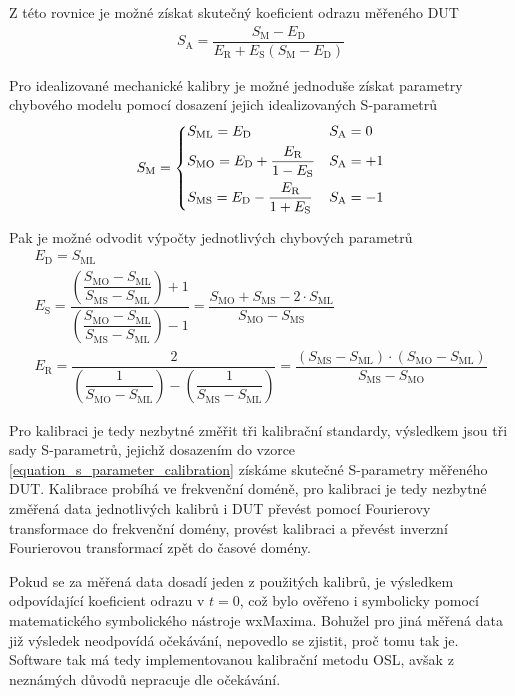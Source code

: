 Z této rovnice je možné získat skutečný koeficient odrazu měřeného DUT
\begin{equation}
\begin{gathered}
	S_\mathrm{A} = \dfrac{S_\mathrm{M} - E_\textrm{D}}{E_\textrm{R} + E_\textrm{S} \left( S_\mathrm{M} - E_\textrm{D} \right) }
\end{gathered}
\label{equation_s_parameter_calibration}
\end{equation}

Pro idealizované mechanické kalibry je možné jednoduše získat parametry chybového modelu pomocí dosazení jejich idealizovaných S-parametrů
\begin{equation}
\begin{gathered}
S_\mathrm{M}=
   \begin{dcases}
	S_\mathrm{ML} = E_\textrm{D} & S_\mathrm{A}=0	\\
	S_\mathrm{MO} = E_\textrm{D} + \dfrac{E_\textrm{R}}{1-E_\mathrm{S}}  & S_\mathrm{A}=+1	\\
	S_\mathrm{MS} = E_\textrm{D} - \dfrac{E_\textrm{R}}{1+E_\mathrm{S}}  & S_\mathrm{A}=-1
   \end{dcases}
\end{gathered}
\end{equation}

Pak je možné odvodit výpočty jednotlivých chybových parametrů
\begin{equation}
\begin{gathered}
   E_\textrm{D}=S_\mathrm{ML} \\
   E_\mathrm{S}=\dfrac{\left( \dfrac{S_\mathrm{MO}-S_\mathrm{ML}}{S_\mathrm{MS}-S_\mathrm{ML}}\right)  +1}{\left( \dfrac{S_\mathrm{MO}-S_\mathrm{ML}}{S_\mathrm{MS}-S_\mathrm{ML}}\right) -1} = \dfrac{S_\mathrm{MO} + S_\mathrm{MS} -2\cdot S_\mathrm{ML}}{S_\mathrm{MO} - S_\mathrm{MS}} \\
   E_\mathrm{R}=\dfrac{2}{\left( \dfrac{1}{S_\mathrm{MO}-S_\mathrm{ML}}\right)  - \left( \dfrac{1}{S_\mathrm{MS}-S_\mathrm{ML}} \right) } = \dfrac{\left( S_\mathrm{MS} - S_\mathrm{ML} \right) \cdot \left( S_\mathrm{MO} - S_\mathrm{ML} \right) }{S_\mathrm{MS} - S_\mathrm{MO}}
\end{gathered}
\end{equation}

Pro kalibraci je tedy nezbytné změřit tři kalibrační standardy, výsledkem jsou tři sady S-parametrů, jejichž dosazením do vzorce \ref{equation_s_parameter_calibration} získáme skutečné S-parametry měřeného DUT. Kalibrace probíhá ve frekvenční doméně, pro kalibraci je tedy nezbytné změřená data jednotlivých kalibrů i DUT převést pomocí Fourierovy transformace do frekvenční domény, provést kalibraci a převést inverzní Fourierovou transformací zpět do časové domény.

Pokud se za měřená data dosadí jeden z použitých kalibrů, je výsledkem odpovídající koeficient odrazu v $t=0$, což bylo ověřeno i symbolicky pomocí matematického symbolického nástroje wxMaxima. Bohužel pro jiná měřená data již výsledek neodpovídá očekávání, nepovedlo se zjistit, proč tomu tak je. Software tak má tedy implementovanou kalibrační metodu OSL, avšak z neznámých důvodů nepracuje dle očekávání.
